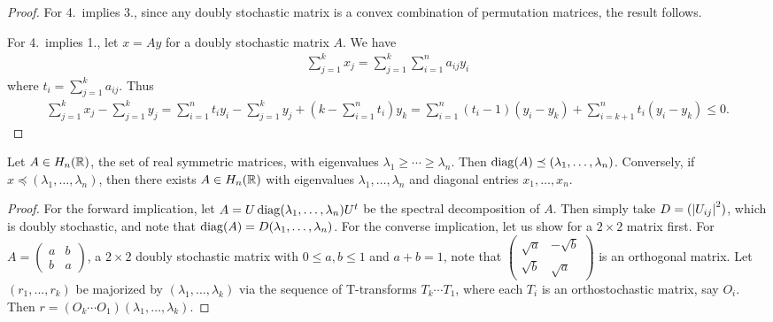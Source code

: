 \begin{proof}
    For 4.~implies 3., since any doubly stochastic matrix is a convex combination of permutation matrices, the result follows.

    For 4.~implies 1., let $x = Ay$ for a doubly stochastic matrix $A$. We have
    \begin{align}
        \sum_{j=1}^{k} x_{j} = \sum_{j=1}^{k} \sum_{i=1}^{n} a_{ij} y_{i}
    \end{align}
    where $t_{i} = \sum_{j=1}^{k} a_{ij}$. Thus
    \begin{align}
        \sum_{j=1}^{k} x_{j} - \sum_{j=1}^{k} y_{j} = \sum_{i=1}^{n} t_{i} y_{i} - \sum_{j=1}^{k} y_{j} + (k-\sum_{i=1}^{n} t_{i}) y_{k} = \sum_{i=1}^{n} (t_{i}-1)(y_{i}-y_{k}) + \sum_{i=k+1}^{n} t_{i}(y_{i}-y_{k}) \leq 0.
    \end{align}
\end{proof}

\begin{theorem}
    Let $A \in H_{n}(\mathbb{R})$, the set of real symmetric matrices, with eigenvalues $\lambda_{1} \geq \cdots \geq \lambda_{n}$. Then $\operatorname{diag}(A) \preceq (\lambda_{1},\ldots,\lambda_{n})$. Conversely, if $x \preceq (\lambda_{1},\ldots,\lambda_{n})$, then there exists $A \in H_{n}(\mathbb{R})$ with eigenvalues $\lambda_{1},\ldots,\lambda_{n}$ and diagonal entries $x_{1},\ldots,x_{n}$.
\end{theorem}

\begin{proof}
    For the forward implication, let $A = U \operatorname{diag}(\lambda_{1},\ldots,\lambda_{n}) U^{t}$ be the spectral decomposition of $A$. Then simply take $D = (\left| U_{ij} \right|^{2})$, which is doubly stochastic, and note that $\operatorname{diag}(A) = D(\lambda_{1},\ldots,\lambda_{n})$. For the converse implication, let us show for a $2 \times 2$ matrix first. For $A = \begin{pmatrix}
        a & b \\ b & a
    \end{pmatrix}$, a $2 \times 2$ doubly stochastic matrix with $0 \leq a,b \leq 1$ and $a+b = 1$, note that $\begin{pmatrix}
        \sqrt{a} & -\sqrt{b} \\ \sqrt{b} & \sqrt{a}
    \end{pmatrix}$ is an orthogonal matrix. Let $(r_{1},\ldots,r_{k})$ be majorized by $(\lambda_{1},\ldots,\lambda_{k})$ via the sequence of T-transforms $T_{k} \cdots T_{1}$, where each $T_{i}$ is an orthostochastic matrix, say $O_{i}$. Then $r = (O_{k} \cdots O_{1})(\lambda_{1},\ldots,\lambda_{k})$. 
\end{proof}

